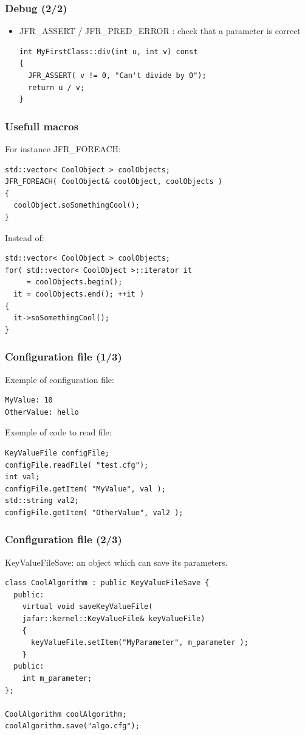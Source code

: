 \documentclass[pdf]{beamer}
\begin{document}
\begin{frame}[fragile]
  \frametitle{Debug (2/2)}
  \begin{itemize}
   \item JFR\_ASSERT / JFR\_PRED\_ERROR : check that a parameter is correct
      \begin{lstlisting}
int MyFirstClass::div(int u, int v) const
{
  JFR_ASSERT( v != 0, "Can't divide by 0");
  return u / v;
}
      \end{lstlisting}
  \end{itemize}
\end{frame}


\begin{frame}[fragile]
  \frametitle{Usefull macros}
  For instance JFR\_FOREACH:
  \begin{lstlisting}
std::vector< CoolObject > coolObjects;
JFR_FOREACH( CoolObject& coolObject, coolObjects )
{
  coolObject.soSomethingCool();
}
  \end{lstlisting}
  Instead of:
  \begin{lstlisting}
std::vector< CoolObject > coolObjects;
for( std::vector< CoolObject >::iterator it
     = coolObjects.begin();
  it = coolObjects.end(); ++it )
{
  it->soSomethingCool();
}
  \end{lstlisting}
\end{frame}


\begin{frame}[fragile]
  \frametitle{Configuration file (1/3)}
Exemple of configuration file:
\begin{lstlisting}
MyValue: 10
OtherValue: hello
\end{lstlisting}
  
Exemple of code to read file:
\begin{lstlisting}
KeyValueFile configFile;
configFile.readFile( "test.cfg");
int val;
configFile.getItem( "MyValue", val );
std::string val2;
configFile.getItem( "OtherValue", val2 );
\end{lstlisting}


\end{frame}


\begin{frame}[fragile]
  \frametitle{Configuration file (2/3)}
KeyValueFileSave: an object which can save its parameters.
 
\begin{lstlisting}
class CoolAlgorithm : public KeyValueFileSave {
  public:
    virtual void saveKeyValueFile(
    jafar::kernel::KeyValueFile& keyValueFile)
    {
      keyValueFile.setItem("MyParameter", m_parameter );
    }
  public:
    int m_parameter;
};

CoolAlgorithm coolAlgorithm;
coolAlgorithm.save("algo.cfg");

\end{lstlisting}
 
\end{frame}
\end{document}

